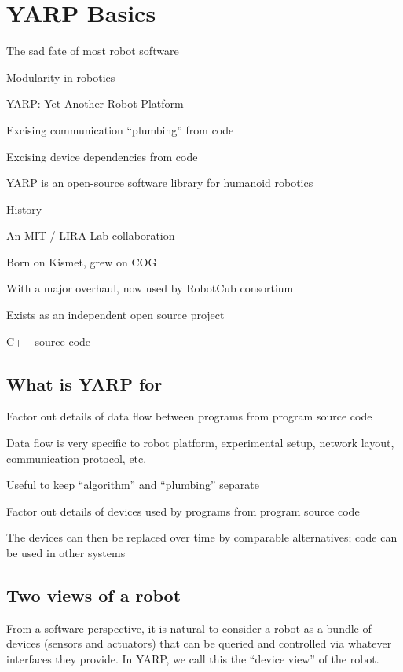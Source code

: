

\section{YARP Basics}


The sad fate of most robot software

Modularity in robotics

YARP: Yet Another Robot Platform

Excising communication ``plumbing'' from code

Excising device dependencies from code



YARP is an open-source software library  for humanoid robotics

History

An MIT / LIRA-Lab collaboration

Born on Kismet, grew on COG

With a major overhaul, now used by RobotCub consortium

Exists as an independent open source project

C++ source code



\subsection{What is YARP for}


Factor out details of data flow between programs from program source code

Data flow is very specific to robot platform, experimental setup,
network layout, communication protocol, etc.

Useful to keep ``algorithm'' and ``plumbing'' separate

Factor out details of devices used by programs from program source code

The devices can then be replaced over time by comparable alternatives;
code can be used in other systems




\subsection{Two views of a robot}

From a software perspective, it is natural to consider a robot
as a bundle of devices (sensors and actuators) that can be
queried and controlled via whatever interfaces they provide.
In YARP, we call this the ``device view'' of the robot.

